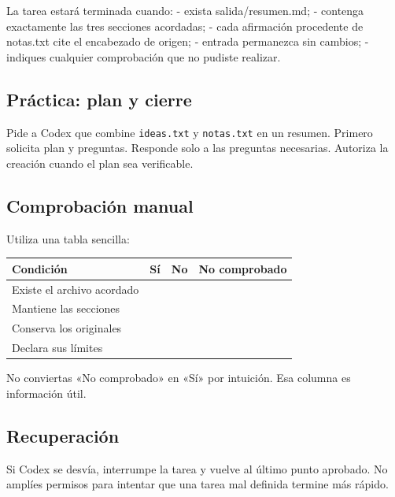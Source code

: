 \documentclass[10pt,a4paper,openany]{book}
\newcounter{none}
\newenvironment{Shaded}{}{}
\newcommand{\NormalTok}[1]{#1}
\renewenvironment{Shaded}
  {\begin{tcolorbox}[
    enhanced,
    breakable,
    colback=CodeBg,
    colframe=Border,
    boxrule=0.5pt,
    arc=2mm,
    left=3mm,
    right=3mm,
    top=2.2mm,
    bottom=2.2mm,
    before skip=0.8em,
    after skip=0.9em
  ]}
  {\end{tcolorbox}}
\begin{document}
\begin{Shaded}
\begin{Highlighting}[]
\NormalTok{La tarea estará terminada cuando:}
\NormalTok{{-} exista salida/resumen.md;}
\NormalTok{{-} contenga exactamente las tres secciones acordadas;}
\NormalTok{{-} cada afirmación procedente de notas.txt cite el encabezado de origen;}
\NormalTok{{-} entrada permanezca sin cambios;}
\NormalTok{{-} indiques cualquier comprobación que no pudiste realizar.}
\end{Highlighting}
\end{Shaded}

\subsection{Práctica: plan y cierre}\label{pruxe1ctica-plan-y-cierre}

Pide a Codex que combine \texttt{ideas.txt} y \texttt{notas.txt} en un
resumen. Primero solicita plan y preguntas. Responde solo a las
preguntas necesarias. Autoriza la creación cuando el plan sea
verificable.

\subsection{Comprobación manual}\label{comprobaciuxf3n-manual-2}

Utiliza una tabla sencilla:

{\def\LTcaptype{none} %
\begin{longtable}[]{@{}lrrr@{}}
\toprule\noalign{}
Condición & Sí & No & No comprobado \\
\midrule\noalign{}
\endhead
\bottomrule\noalign{}
\endlastfoot
Existe el archivo acordado & & & \\
Mantiene las secciones & & & \\
Conserva los originales & & & \\
Declara sus límites & & & \\
\end{longtable}
}

No conviertas «No comprobado» en «Sí» por intuición. Esa columna es
información útil.

\subsection{Recuperación}\label{recuperaciuxf3n-3}

Si Codex se desvía, interrumpe la tarea y vuelve al último punto
aprobado. No amplíes permisos para intentar que una tarea mal definida
termine más rápido.
\end{document}
